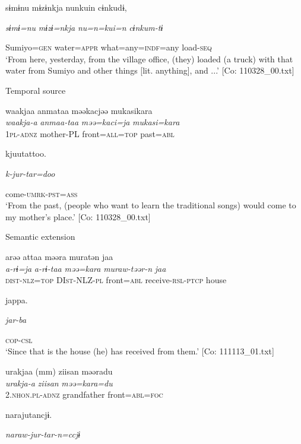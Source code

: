 \begin{table}
      sɨmɨnu  mɨzɨnkja  nunkuin  cɨnkudɨ,

      \textit{sɨmɨ=nu}  \textit{mɨzɨ=nkja}  \textit{nu=n=kui=n}  \textit{cɨnkum-tɨ}

      Sumiyo=\textsc{gen}  water=\textsc{appr}  what=any=\textsc{indf}=any  load-\textsc{seq}\\
\glt ‘From here, yesterday, from the village office, (they) loaded (a truck) with that water from Sumiyo and other things [lit. anything], and ...’ [Co: 110328\_00.txt]
\z

  Temporal source

\ex {\TM}  waakjaa  anmataa  məəkacjəə  mukasikara\\
\glll \textit{waakja-a}  \textit{anmaa-taa}  \textit{məə=kaci=ja}  \textit{mukasi=kara}\\
1\textsc{pl}-\textsc{adnz}  mother-PL  front=\textsc{all}=\textsc{top}  past=\textsc{abl}

      kjuutattoo.

      \textit{k-jur-tar=doo}

      come-\textsc{umrk}-\textsc{pst}=\textsc{ass}\\
\glt ‘From the past, (people who want to learn the traditional songs) would come to my mother’s place.’ [Co: 110328\_00.txt]
\z

  Semantic extension

\ex {\TM}  arəə  attaa  məəra  muratən  jaa\\
\glll \textit{a-rɨ=ja}  \textit{a-rɨ-taa}  \textit{məə=kara}  \textit{muraw-təər-n}  \textit{jaa}\\
\textsc{dist}-\textsc{nlz}=\textsc{top}  DI\textsc{st}-NLZ-\textsc{pl}  front=\textsc{abl}  receive-\textsc{rsl}-\textsc{ptcp}  house

      jappa.

      \textit{jar-ba}

      \textsc{cop}-\textsc{csl}\\
\glt ‘Since that is the house (he) has received from them.’ [Co: 111113\_01.txt]
\z

\ex {\TM}  urakjaa  (mm)  ziisan  məəradu\\
\glll \textit{urakja-a}    \textit{ziisan}  \textit{məə=kara=du}\\
2.\textsc{nhon}.\textsc{pl}-\textsc{adnz}    grandfather  front=\textsc{abl}=\textsc{foc}

      narajutancjɨ.

      \textit{naraw-jur-tar-n=ccjɨ}


\end{table}

